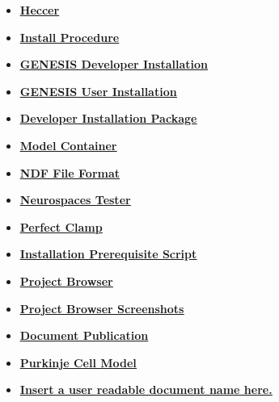 \documentclass[12pt]{article}
\begin{document}
\begin{itemize}
\item \href{../heccer/heccer.pdf}{\bf \underline{Heccer}}

\item \href{../install-procedure/install-procedure.pdf}{\bf \underline{Install Procedure}}

\item \href{../installation-developer/installation-developer.pdf}{\bf \underline{GENESIS Developer Installation}}

\item \href{../installation-user/installation-user.pdf}{\bf \underline{GENESIS User Installation}}

\item \href{../installer-package/installer-package.pdf}{\bf \underline{Developer Installation Package}}

\item \href{../model-container/model-container.pdf}{\bf \underline{Model Container}}

\item \href{../ndf-file-format/ndf-file-format.pdf}{\bf \underline{NDF File Format}}

\item \href{../neurospaces-tester/neurospaces-tester.pdf}{\bf \underline{Neurospaces Tester}}

\item \href{../pclamp/pclamp.pdf}{\bf \underline{Perfect Clamp}}

\item \href{../prerequisite-script/prerequisite-script.pdf}{\bf \underline{Installation Prerequisite Script}}

\item \href{../project-browser/project-browser.pdf}{\bf \underline{Project Browser}}

\item \href{../project-browser-screenshots/project-browser-screenshots.pdf}{\bf \underline{Project Browser Screenshots}}

\item \href{../publication/publication.pdf}{\bf \underline{Document Publication}}

\item \href{../purkinje-cell-model/purkinje-cell-model.pdf}{\bf \underline{Purkinje Cell Model}}

\item \href{../release-expand/release-expand.pdf}{\bf \underline{Insert a user readable document name here.}}


\end{itemize}
\end{document}
